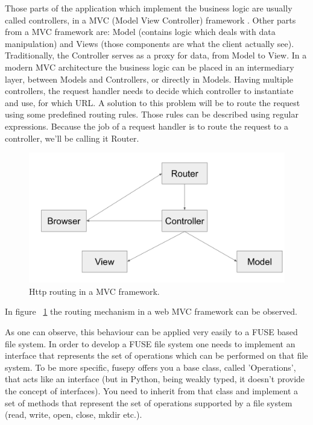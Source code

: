 Those parts of the application which implement the business logic are usually called controllers, in a MVC (Model View Controller) framework \cite{Deacon2009}. Other parts from a MVC framework are: Model (contains logic which deals with data manipulation) and Views (those components are what the client actually see). Traditionally, the Controller serves as a proxy for data, from Model to View. In a modern MVC architecture the business logic can be placed in an intermediary layer, between Models and Controllers, or directly in Models. Having multiple controllers, the request handler needs to decide which controller to instantiate and use, for which URL. A solution to this problem will be to route the request using some predefined routing rules. Those rules can be described using regular expressions. Because the job of a request handler is to route the request to a controller, we'll be calling it Router.

\begin{figure}[h]
  \begin{center}
    \includegraphics[width=15cm]{layout/mvc.png}
    \caption{Http routing in a MVC framework.}
    \label{fig:mvc}
  \end{center}
\end{figure}

In figure ~\ref{fig:mvc} the routing mechanism in a web MVC framework can be observed.

As one can observe, this behaviour can be applied very easily to a FUSE based file system. In order to develop a FUSE file system one needs to implement an interface that represents the set of operations which can be performed on that file system. To be more specific, fusepy offers you a base class, called 'Operations', that acts like an interface (but in Python, being weakly typed, it doesn't provide the concept of interfaces). You need to inherit from that class and implement a set of methods that represent the set of operations supported by a file system (read, write, open, close, mkdir etc.).

